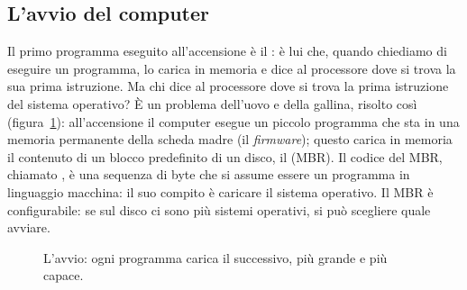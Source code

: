 \subsection{L'avvio del computer}

Il primo programma eseguito all'accensione è il :
è lui che, quando chiediamo di eseguire un programma, lo carica in memoria
e dice al processore dove si trova la sua prima istruzione. Ma chi dice al
processore dove si trova la prima istruzione del sistema operativo? È un
problema dell'uovo e della gallina, risolto così
(figura~\ref{fig:avvio}): all'accensione il computer esegue un piccolo
programma che sta in una memoria permanente della scheda madre (il
\textit{firmware}); questo carica in memoria il contenuto di un blocco
predefinito di un disco, il  (MBR). Il codice del
MBR, chiamato , è una sequenza di byte che si assume essere
un programma in linguaggio macchina: il suo compito è caricare il sistema
operativo. Il MBR è configurabile: se sul disco ci sono più sistemi
operativi, si può scegliere quale avviare.

\begin{figure}[H]
  \centering
  \caption{L'avvio: ogni programma carica il successivo, più grande e più
           capace.}
  \label{fig:avvio}
\end{figure}



